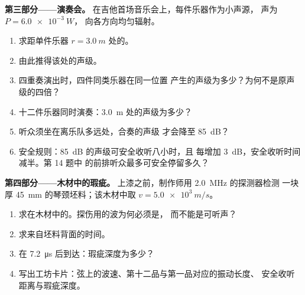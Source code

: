 \begin{problem}
\medskip
\noindent\textbf{第三部分——演奏会。}
在吉他首场音乐会上，每件乐器作为小声源，
声为 $P = \qty{6.0e-3}{W}$，
向各方向均匀辐射。
\begin{enumerate}[resume]
  \item 求距单件乐器 $r = \qty{3.0}{m}$ 处的。
  \item 由此推得该处的声级。
  \item 四重奏演出时，四件同类乐器在同一位置
        产生的声级为多少？为何不是原声级的四倍？
  \item 十二件乐器同时演奏：\qty{3.0}{m} 处的声级为多少？
  \item 听众须坐在离乐队多远处，合奏的声级
        才会降至 \qty{85}{dB}？
  \item 安全规则：\qty{85}{dB} 的声级可安全收听八小时，且
        每增加 \qty{+3}{dB}，安全收听时间减半。第 14 题中
        的前排听众最多可安全停留多久？
\end{enumerate}

\medskip
\noindent\textbf{第四部分——木材中的瑕疵。}
上漆之前，制作师用 \qty{2.0}{MHz} 的探测器检测
一块厚 \qty{45}{mm} 的琴颈坯料；该木材中取 $v = \qty{5.0e3}{m/s}$。
\begin{enumerate}[resume]
  \item 求在木材中的。探伤用的波为何必须是，
        而不能是可听声？
  \item 求来自坯料背面的时间。
  \item {}在 \qty{7.2}{\micro s} 后到达：瑕疵深度为多少？
  \item 写出工坊卡片：弦上的波速、第十二品与第一品对应的振动长度、
        安全收听距离与瑕疵深度。
\end{enumerate}
\end{problem}
